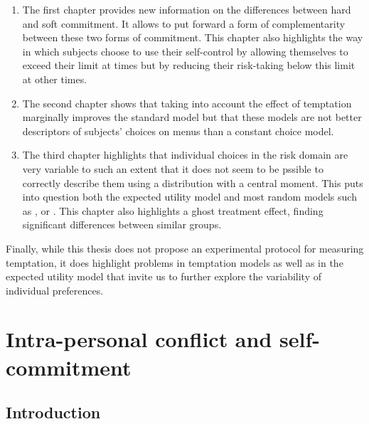 \documentclass[
]{book}
\providecommand{\tightlist}{%
  \setlength{\itemsep}{0pt}\setlength{\parskip}{0pt}}
\begin{document}
\begin{enumerate}
\def\labelenumi{\arabic{enumi}.}
\tightlist
\item
  The first chapter provides new information on the differences between hard
  and soft commitment.
  It allows to put forward a form of complementarity between these two forms of
  commitment.
  This chapter also highlights the way in which subjects choose to use their
  self-control by allowing themselves to exceed their limit at times but by
  reducing their risk-taking below this limit at other times.
\item
  The second chapter shows that taking into account the effect of temptation
  marginally improves the standard model but that these models are not better
  descriptors of subjects' choices on menus than a constant choice model.
\item
  The third chapter highlights that individual choices in the risk domain are
  very variable to such an extent that it does not seem to be pssible to correctly describe them
  using a distribution with a central moment.
  This puts into question both the expected utility model and most random models
  such as \citet{gul2006random}, \citet{ratcliff2008diffusion} or \citet{cerreia2019deliberately}.
  This chapter also highlights a ghost treatment effect, finding significant
  differences between similar groups.
\end{enumerate}

Finally, while this thesis does not propose an experimental protocol for
measuring temptation, it does highlight problems in temptation models as well as
in the expected utility model that invite us to further explore the variability
of individual preferences.

\hypertarget{fdj}{%
\chapter{Intra-personal conflict and self-commitment}\label{fdj}}

\hypertarget{intro2}{%
\section{Introduction}\label{intro2}}
\end{document}
